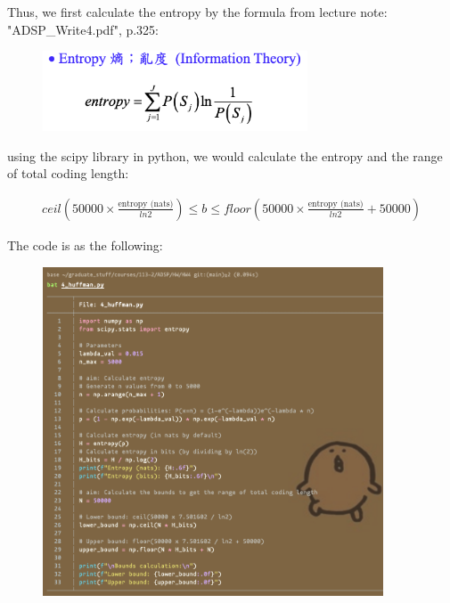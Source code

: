 \documentclass{article}
\begin{document}



Thus, we first calculate the entropy by the formula from lecture note: "ADSP\_Write4.pdf", p.325:

\begin{figure}[H]
    \centering
    \includegraphics[width=0.7\textwidth]{HW4_img/4_entropy}
\end{figure}

using the scipy library in python, we would calculate the entropy and the range of total coding length:

\begin{align*}
    ceil(50000 \times \frac{\text{entropy (nats)}}{ln 2}) \leq b \leq floor(50000 \times \frac{\text{entropy (nats)}}{ln 2} + 50000)
\end{align*}

The code is as the following:

\begin{figure}[H]
    \centering
    \includegraphics[width=0.9\textwidth]{HW4_img/4_code_huffman.png}
\end{figure}
\end{document}
